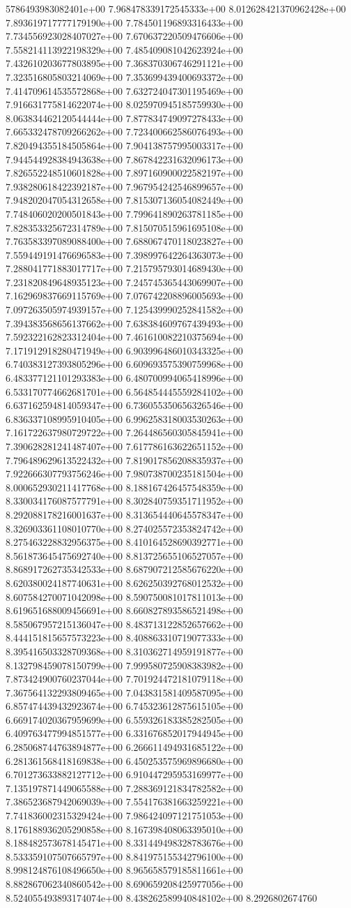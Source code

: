 5786493983082401e+00	7.968478339172545333e+00	8.012628421370962428e+00	7.893619717777179190e+00	7.784501196893316433e+00	7.734556923028407027e+00	7.670637220509476606e+00	7.558214113922198329e+00	7.485409081042623924e+00	7.432610203677803895e+00	7.368370306746291121e+00	7.323516805803214069e+00	7.353699439400693372e+00	7.414709614535572868e+00	7.632724047301195469e+00	7.916631775814622074e+00	8.025970945185759930e+00	8.063834462120544444e+00	7.877834749097278433e+00	7.665332478709266262e+00	7.723400662586076493e+00	7.820494355184505864e+00	7.904138757995003317e+00	7.944544928384943638e+00	7.867842231632096173e+00	7.826552248510601828e+00	7.897160900022582197e+00	7.938280618422392187e+00	7.967954242546899657e+00	7.948202047054312658e+00	7.815307136054082449e+00	7.748406020200501843e+00	7.799641890263781185e+00	7.828353325672314789e+00	7.815070515961695108e+00	7.763583397089088400e+00	7.688067470118023827e+00	7.559449191476696583e+00	7.398997642264363073e+00	7.288041771883017717e+00	7.215795793014689430e+00	7.231820849648935123e+00	7.245745365443069907e+00	7.162969837669115769e+00	7.076742208896005693e+00	7.097263505974939157e+00	7.125439990252841582e+00	7.394383568656137662e+00	7.638384609767439493e+00	7.592322162823312404e+00	7.461610082210375694e+00	7.171912918280471949e+00	6.903996486010343325e+00	6.740383127393805296e+00	6.609693575390759968e+00	6.483377121101293383e+00	6.480700994065418996e+00	6.533170774662681701e+00	6.564854445559284102e+00	6.637162594814059347e+00	6.736055350656326546e+00	6.836337108995910405e+00	6.996258318003530263e+00	7.161722637980729722e+00	7.264486560305845941e+00	7.390628281241487407e+00	7.617786163622651152e+00	7.796489629613522432e+00	7.819017856208835937e+00	7.922666307793756246e+00	7.980738700235181504e+00	8.000652930211417768e+00	8.188167426457548359e+00	8.330034176087577791e+00	8.302840759351711952e+00	8.292088178216001637e+00	8.313654440645578347e+00	8.326903361108010770e+00	8.274025572353824742e+00	8.275463228832956375e+00	8.410164528690392771e+00	8.561873645475692740e+00	8.813725655106527057e+00	8.868917262735342533e+00	8.687907212585676220e+00	8.620380024187740631e+00	8.626250392768012532e+00	8.607584270071042098e+00	8.590750081017811013e+00	8.619651688009456691e+00	8.660827893586521498e+00	8.585067957215136047e+00	8.483713122852657662e+00	8.444151815657573223e+00	8.408863310719077333e+00	8.395416503328709368e+00	8.310362714959191877e+00	8.132798459078150799e+00	7.999580725908383982e+00	7.873424900760237044e+00	7.701924472181079118e+00	7.367564132293809465e+00	7.043831581409587095e+00	6.857474439432923674e+00	6.745323612875615105e+00	6.669174020367959699e+00	6.559326183385282505e+00	6.409763477994851577e+00	6.331676852017944945e+00	6.285068744763894877e+00	6.266611494931685122e+00	6.281361568418169838e+00	6.450253575969896680e+00	6.701273633882127712e+00	6.910447295953169977e+00	7.135197871449065588e+00	7.288369121834782582e+00	7.386523687942069039e+00	7.554176381663259221e+00	7.741836002315329424e+00	7.986424097121751053e+00	8.176188936205290858e+00	8.167398408063395010e+00	8.188482573678145471e+00	8.331449498328783676e+00	8.533359107507665797e+00	8.841975155342796100e+00	8.998124876108496650e+00	8.965658579185811661e+00	8.882867062340860542e+00	8.690659208425977056e+00	8.524055493893174074e+00	8.438262589940848102e+00	8.2926802674760